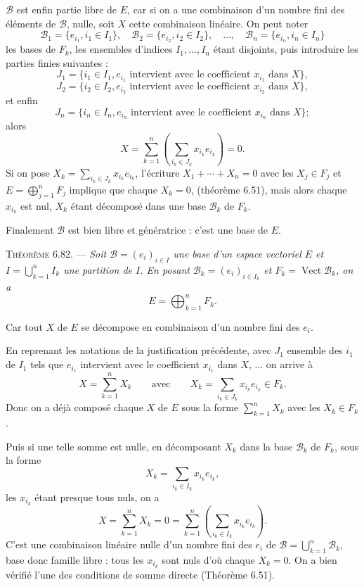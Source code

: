 $\mathcal B$ est enfin partie libre de $E$, car si on a une combinaison d'un nombre fini des éléments de $\mathcal B$, nulle, soit $X$ cette combinaison linéaire. On peut noter
\[
\mathcal B_1=\{e_{i_1},i_1\in I_1\},\quad \mathcal B_2=\{e_{i_2},i_2\in I_2\},\quad\ldots,\quad \mathcal B_n=\{e_{i_n},i_n\in I_n\}
\]
les bases de $F_k$, les ensembles d'indices $I_1,\ldots,I_n$ étant disjoints, puis introduire les parties finies suivantes :
\[
J_1=\{i_1\in I_1,e_{i_1}\text{ intervient avec le coefficient }x_{i_1}\text{ dans }X\},
\]
\[
J_2=\{i_2\in I_2,e_{i_2}\text{ intervient avec le coefficient }x_{i_2}\text{ dans }X\},
\]
et enfin
\[
J_n=\{i_n\in I_n,e_{i_n}\text{ intervient avec le coefficient }x_{i_n}\text{ dans }X\};
\]
alors
\[
X=\sum_{k=1}^n\left(\sum_{i_k\in J_k}x_{i_k}e_{i_k}\right)=0.
\]
Si on pose $X_k=\sum_{i_k\in J_k}x_{i_k}e_{i_k}$, l'écriture $X_1+\cdots+X_n=0$ avec les $X_j\in F_j$ et $E=\bigoplus_{j=1}^nF_j$ implique que chaque $X_k=0$, (théorème 6.51), mais alors chaque $x_{i_k}$ est nul, $X_k$ étant décomposé dans une base $\mathcal B_k$ de $F_k$.

Finalement $\mathcal B$ est bien libre et génératrice : c'est une base de $E$. \bookend

\medskip\noindent\textsc{Théorème 6.82.} --- \emph{Soit $\mathcal B=(e_i)_{i\in I}$ une base d'un espace vectoriel $E$ et $I=\bigcup_{k=1}^n I_k$ une partition de $I$. En posant $\mathcal B_k=(e_i)_{i\in I_k}$ et $F_k=\operatorname{Vect}\mathcal B_k$, on a
\[
E=\bigoplus_{k=1}^n F_k.
\]}

Car tout $X$ de $E$ se décompose en combinaison d'un nombre fini des $e_i$.

En reprenant les notations de la justification précédente, avec $J_1$ ensemble des $i_1$ de $I_1$ tels que $e_{i_1}$ intervient avec le coefficient $x_{i_1}$ dans $X$, ... on arrive à
\[
X=\sum_{k=1}^n X_k\qquad\text{avec}\qquad X_k=\sum_{i_k\in J_k}x_{i_k}e_{i_k}\in F_k.
\]
Donc on a déjà composé chaque $X$ de $E$ sous la forme $\sum_{k=1}^nX_k$ avec les $X_k\in F_k$.

Puis si une telle somme est nulle, en décomposant $X_k$ dans la base $\mathcal B_k$ de $F_k$, sous la forme
\[
X_k=\sum_{i_k\in I_k}x_{i_k}e_{i_k},
\]
les $x_{i_k}$ étant presque tous nuls, on a
\[
X=\sum_{k=1}^nX_k=0
=\sum_{k=1}^n\left(\sum_{i_k\in I_k}x_{i_k}e_{i_k}\right).
\]
C'est une combinaison linéaire nulle d'un nombre fini des $e_i$ de $\mathcal B=\bigcup_{k=1}^n\mathcal B_k$, base donc famille libre : tous les $x_{i_k}$ sont nuls d'où chaque $X_k=0$. On a bien vérifié l'une des conditions de somme directe (Théorème 6.51). \bookend

